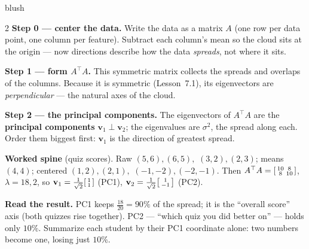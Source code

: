 \documentclass[10pt]{article}
\newcommand{\vv}{\mathbf{v}}
\newcommand{\T}{^{\top}}
\begin{document}
\begin{skillbox}[Lesson]{blush}
\begin{multicols}{2}
\textbf{Step 0 --- center the data.} Write the data as a matrix $A$ (one row per data point, one column per
feature). Subtract each column's mean so the cloud sits at the origin --- now directions describe how the
data \emph{spreads}, not where it sits.

\textbf{Step 1 --- form $A\T A$.} This symmetric matrix collects the spreads and overlaps of the columns.
Because it is symmetric (Lesson~7.1), its eigenvectors are \emph{perpendicular} --- the natural axes of the
cloud.

\textbf{Step 2 --- the principal components.} The eigenvectors of $A\T A$ are the \textbf{principal
components} $\vv_1\perp\vv_2$; the eigenvalues are $\sigma^2$, the spread along each. Order them biggest
first: $\vv_1$ is the direction of greatest spread.

\columnbreak

\textbf{Worked spine} (quiz scores). Raw $(5,6),(6,5),$ $(3,2),(2,3)$; means $(4,4)$; centered
$(1,2),(2,1),$ $(-1,-2),(-2,-1)$. Then $A\T A=\begin{bsmallmatrix} 10 & 8\\ 8 & 10 \end{bsmallmatrix}$,
$\lambda=18,2$, so $\vv_1=\tfrac1{\sqrt2}\begin{bsmallmatrix} 1\\1 \end{bsmallmatrix}$ (PC1),
$\vv_2=\tfrac1{\sqrt2}\begin{bsmallmatrix} 1\\-1 \end{bsmallmatrix}$ (PC2).

\textbf{Read the result.} PC1 keeps $\tfrac{18}{20}=90\%$ of the spread; it is the ``overall score''
axis (both quizzes rise together). PC2 --- ``which quiz you did better on'' --- holds only $10\%$. Summarize
each student by their PC1 coordinate alone: two numbers become one, losing just $10\%$.
\end{multicols}
\end{skillbox}
\end{document}
